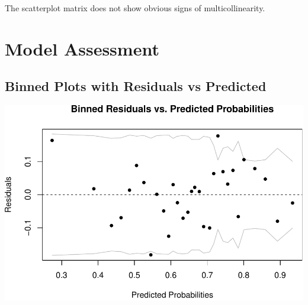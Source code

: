 \documentclass[]{article}
\newenvironment{Shaded}{\begin{snugshade}}{\end{snugshade}}
\newcommand{\DataTypeTok}[1]{\textcolor[rgb]{0.13,0.29,0.53}{#1}}
\newcommand{\KeywordTok}[1]{\textcolor[rgb]{0.13,0.29,0.53}{\textbf{#1}}}
\newcommand{\NormalTok}[1]{#1}
\newcommand{\OperatorTok}[1]{\textcolor[rgb]{0.81,0.36,0.00}{\textbf{#1}}}
\newcommand{\StringTok}[1]{\textcolor[rgb]{0.31,0.60,0.02}{#1}}
\begin{document}
The scatterplot matrix does not show obvious signs of multicollinearity.

\hypertarget{model-assessment-1}{%
\section{Model Assessment}\label{model-assessment-1}}

\hypertarget{binned-plots-with-residuals-vs-predicted-1}{%
\subsection{Binned Plots with Residuals vs
Predicted}\label{binned-plots-with-residuals-vs-predicted-1}}

\begin{Shaded}
\end{Shaded}

\includegraphics{Project_files/figure-latex/unnamed-chunk-22-1.pdf}
\end{document}

